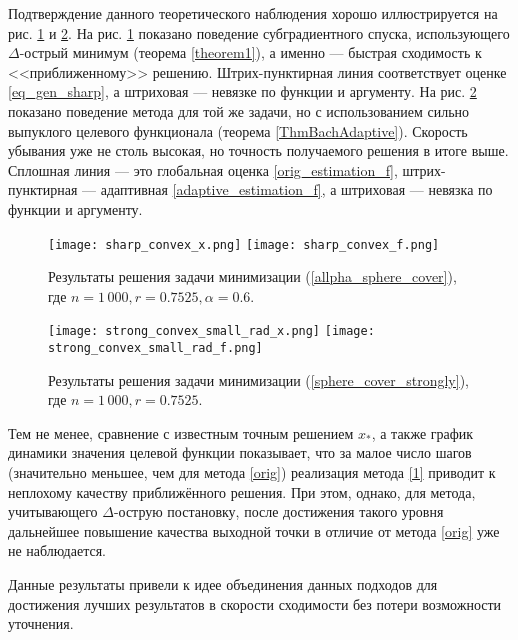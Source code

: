     Подтверждение данного теоретического наблюдения хорошо иллюстрируется на рис. \ref{res_sharp_convex} и \ref{res_strong_convex}. На рис. \ref{res_sharp_convex} показано поведение субградиентного спуска, использующего $\Delta$-острый минимум (теорема \ref{theorem1}), а именно --- быстрая сходимость к <<приближенному>> решению. Штрих-пунктирная линия соответствует оценке \eqref{eq_gen_sharp}, а штриховая --- невязке по функции и аргументу. На рис. \ref{res_strong_convex} показано поведение метода для той же задачи, но с использованием сильно выпуклого целевого функционала (теорема \ref{ThmBachAdaptive}). Скорость убывания уже не столь высокая, но точность получаемого решения в итоге выше. Сплошная линия --- это глобальная оценка \eqref{orig_estimation_f}, штрих-пунктирная --- адаптивная \eqref{adaptive_estimation_f}, а штриховая --- невязка по функции и аргументу.

    \begin{figure}[h]
        \texttt{[image: sharp\_convex\_x.png]}
        \endminipage\hfill
        \texttt{[image: sharp\_convex\_f.png]}
        \endminipage\hfill
        \caption{ Результаты решения задачи минимизации (\ref{allpha_sphere_cover}), где  $n= 1\,000, r = 0.7525, \alpha = 0.6$.}
        \label{res_sharp_convex}
    \end{figure}

    \begin{figure}[h]
        \texttt{[image: strong\_convex\_small\_rad\_x.png]}
        \endminipage\hfill
        \texttt{[image: strong\_convex\_small\_rad\_f.png]}
        \endminipage\hfill
        \caption{ Результаты решения задачи минимизации (\ref{sphere_cover_strongly}), где  $n= 1\,000, r = 0.7525$.}
        \label{res_strong_convex}
    \end{figure}

    Тем не менее, сравнение с известным точным решением $x_*$, а также график динамики значения целевой функции показывает, что за малое число шагов (значительно меньшее, чем для метода \eqref{orig}) реализация метода \eqref{1} приводит к неплохому качеству приближённого решения. При этом, однако, для метода, учитывающего $\Delta$-острую постановку, после достижения такого уровня дальнейшее повышение качества выходной точки в отличие от метода \eqref{orig} уже не наблюдается. 

    Данные результаты привели к идее объединения данных подходов для достижения лучших результатов в скорости сходимости без потери возможности уточнения.


